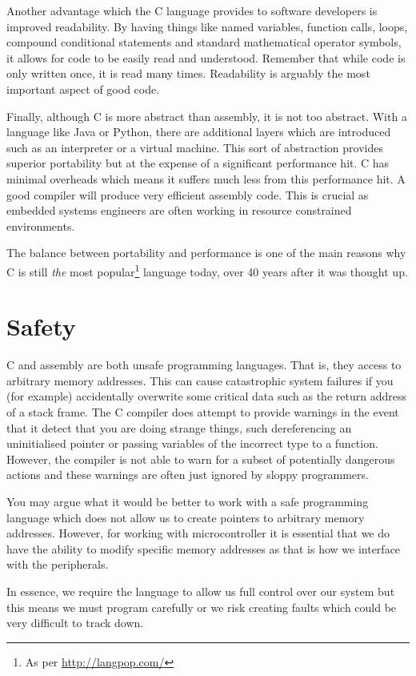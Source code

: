 Another advantage which the C language provides to software developers is improved readability. 
By having things like named variables, function calls, loops, compound conditional statements and standard mathematical operator symbols, it allows for code to be easily read and understood. 
Remember that while code is only written once, it is read many times. Readability is arguably the most important aspect of good code.

Finally, although C is more abstract than assembly, it is not too abstract. With a language like Java or Python, there are additional layers which are introduced such as an interpreter or a virtual machine. This sort of abstraction provides superior portability but at the expense of a significant performance hit. C has minimal overheads which means it suffers much less from this performance hit.
A good compiler will produce very efficient assembly code.
This is  crucial as embedded systems engineers are often working in resource constrained environments.

The balance between portability and performance is one of the main reasons why C is still \emph{the} most popular\footnote{As per \url{http://langpop.com/}} language today, over 40 years after it was thought up. 

\section{Safety}
C and assembly are both unsafe programming languages. That is, they access to arbitrary memory addresses. This can cause catastrophic system failures if you (for example) accidentally overwrite some critical data such as the return address of a stack frame.
The C compiler does attempt to provide warnings in the event that it detect that you are doing strange things, such dereferencing an uninitialised pointer or passing variables of the incorrect type to a function. However, the compiler is not able to warn for a subset of potentially dangerous actions and these warnings are often just ignored by sloppy programmers. 

You may argue what it would be better to work with a safe programming language which does not allow us to create pointers to arbitrary memory addresses. However, for working with microcontroller it is essential that we do have the ability to modify specific memory addresses as that is how we interface with the peripherals. 

In essence, we require the language to allow us full control over our system but this means we must program carefully or we risk creating faults which could be very difficult to track down.


